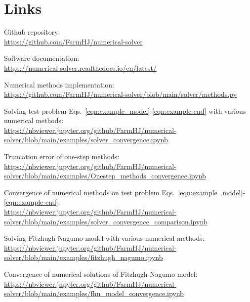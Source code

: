 \chapter{Links}
\label{chap:link}
\vspace{1em}

\noindent Github repository: \\
\url{https://github.com/FarmHJ/numerical-solver}
\vspace{1.1em}

\noindent Software documentation: \\
\url{https://numerical-solver.readthedocs.io/en/latest/}
\vspace{1.1em}

\noindent Numerical methods implementation: \\
\url{https://github.com/FarmHJ/numerical-solver/blob/main/solver/methods.py}
\vspace{1.1em}

\vspace{1em}

\noindent Solving test problem Eqs.~\eqref{eqn:example_model}-\eqref{eqn:example-end} with various numerical methods: \\
\url{https://nbviewer.jupyter.org/github/FarmHJ/numerical-solver/blob/main/examples/solver_convergence.ipynb} 
\vspace{1.1em}

\noindent Truncation error of one-step methods: \\
\url{https://nbviewer.jupyter.org/github/FarmHJ/numerical-solver/blob/main/examples/Onestep_methods_convergence.ipynb}
\vspace{1.1em}

\noindent Convergence of numerical methods on test problem Eqs.~\eqref{eqn:example_model}-\eqref{eqn:example-end}: \\
\url{https://nbviewer.jupyter.org/github/FarmHJ/numerical-solver/blob/main/examples/solver_convergence_comparison.ipynb}
\vspace{1.1em}

\noindent Solving Fitzhugh-Nagumo model with various numerical methods: \\
\url{https://nbviewer.jupyter.org/github/FarmHJ/numerical-solver/blob/main/examples/fitzhugh_nagumo.ipynb}
\vspace{1.1em}

\noindent Convergence of numerical solutions of Fitzhugh-Nagumo model: \\
\url{https://nbviewer.jupyter.org/github/FarmHJ/numerical-solver/blob/main/examples/fhn_model_convergence.ipynb}
